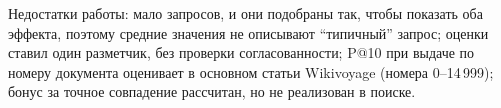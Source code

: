 Недостатки работы: мало запросов, и они подобраны так, чтобы показать оба эффекта, поэтому средние значения не описывают \enquote{типичный} запрос; оценки ставил один разметчик, без проверки согласованности; P@10 при выдаче по номеру документа оценивает в основном статьи Wikivoyage (номера 0--14\,999); бонус за точное совпадение рассчитан, но не реализован в поиске.
